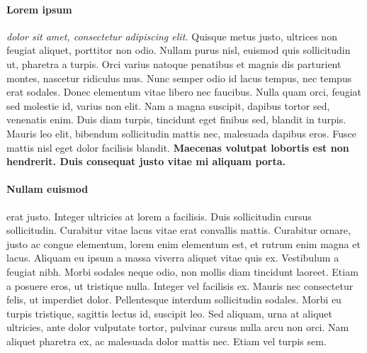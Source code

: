 \vspace{10pt}
\paragraph{Lorem ipsum}\textit{dolor sit amet, consectetur adipiscing elit.} Quisque metus justo, ultrices non feugiat aliquet, porttitor non odio. Nullam purus nisl, euismod quis sollicitudin ut, pharetra a turpis. Orci varius natoque penatibus et magnis dis parturient montes, nascetur ridiculus mus. Nunc semper odio id lacus tempus, nec tempus erat sodales. Donec elementum vitae libero nec faucibus. Nulla quam orci, feugiat sed molestie id, varius non elit. Nam a magna suscipit, dapibus tortor sed, venenatis enim. Duis diam turpis, tincidunt eget finibus sed, blandit in turpis. Mauris leo elit, bibendum sollicitudin mattis nec, malesuada dapibus eros. Fusce mattis nisl eget dolor facilisis blandit. \textbf{Maecenas volutpat lobortis est non hendrerit. Duis consequat justo vitae mi aliquam porta.}
\paragraph{Nullam euismod}erat justo. Integer ultricies at lorem a facilisis. Duis sollicitudin cursus sollicitudin. Curabitur vitae lacus vitae erat convallis mattis. Curabitur ornare, justo ac congue elementum, lorem enim elementum est, et rutrum enim magna et lacus. Aliquam eu ipsum a massa viverra aliquet vitae quis ex. Vestibulum a feugiat nibh. Morbi sodales neque odio, non mollis diam tincidunt laoreet. Etiam a posuere eros, ut tristique nulla. Integer vel facilisis ex. Mauris nec consectetur felis, ut imperdiet dolor. Pellentesque interdum sollicitudin sodales. Morbi eu turpis tristique, sagittis lectus id, suscipit leo. Sed aliquam, urna at aliquet ultricies, ante dolor vulputate tortor, pulvinar cursus nulla arcu non orci. Nam aliquet pharetra ex, ac malesuada dolor mattis nec. Etiam vel turpis sem. 